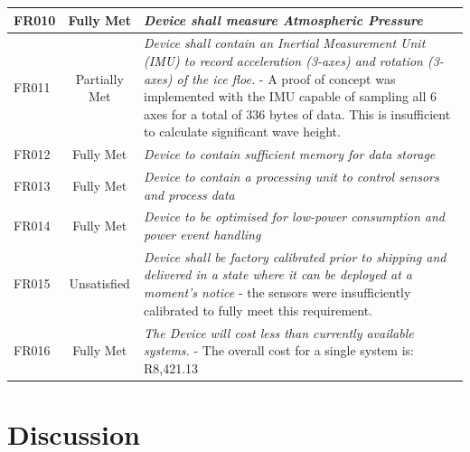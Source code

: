 \begin{table}[H]
\begin{tabular}{|m{}|c| m{}|}
          \hline
     FR010 & Fully Met & \textit{Device shall measure Atmospheric Pressure}\\
          \hline
     FR011 & Partially Met &\textit{Device shall contain an Inertial Measurement Unit (IMU) to record acceleration (3-axes) and rotation (3-axes) of the ice floe.} - A proof of concept was implemented with the IMU capable of sampling all 6 axes for a total of 336 bytes of data. This is insufficient to calculate significant wave height.\\
          \hline
     FR012 & Fully Met & \textit{Device to contain sufficient memory for data storage}\\
          \hline
     FR013 & Fully Met &\textit{ Device to contain a processing unit to control sensors and process data}\\     
     \hline
     FR014 & Fully Met & \textit{ Device to be optimised for low-power consumption and power event handling}\\
          \hline
     FR015 & Unsatisfied & \textit{Device shall be factory calibrated prior to shipping and delivered in a state where it can be deployed at a moment's notice} - the sensors were insufficiently calibrated to fully meet this requirement.\\
          \hline
    FR016 & Fully Met & \textit{The Device will cost less than currently available systems.} - The overall cost for a single system is: R8,421.13 \\
    \hline
    \end{tabular}

    \label{tab:final_eval_funcreq}
\end{table}

\section{Discussion}
\label{sec:ch4_disc}

